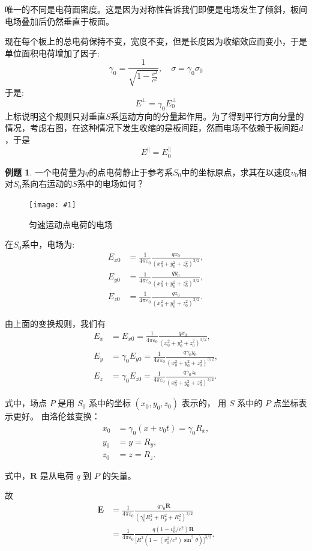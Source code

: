 \documentclass[12pt,a4paper,oneside]{report}
\theoremstyle{definition}
\newtheorem{example}{例题}[chapter]
\theoremstyle{remark}
\newcommand{\insertfig}[3]{
    \begin{figure}[ht]
        \centering
        \texttt{[image: \#1]}
        \caption{#2}
        \label{fig:#1}
    \end{figure}
}
\newcommand{\mb}[1]{\mathbf{#1}}
\begin{document}
唯一的不同是电荷面密度。这是因为对称性告诉我们即便是电场发生了倾斜，板间电场叠加后仍然垂直于板面。

现在每个板上的总电荷保持不变，宽度不变，但是长度因为收缩效应而变小，于是单位面积电荷增加了因子:
\[
\gamma_0 = \frac{1}{\sqrt{1-\frac{v^2}{c^2}}},\quad \sigma = \gamma_0\sigma_0
\]
于是:
\[
E^{\perp} = \gamma_0E_0^{\perp}
\]
上标说明这个规则只对垂直$S$系运动方向的分量起作用。为了得到平行方向分量的情况，考虑右图，在这种情况下发生收缩的是板间距，然而电场不依赖于板间距$d$，于是
\[
E^{\parallel} = E_0^{\parallel}
\]

\begin{example}
  一个电荷量为$q$的点电荷静止于参考系$S_0$中的坐标原点，求其在以速度$v_0$相对$S_0$系向右运动的$S$系中的电场如何？

  \insertfig{5-8.png}{匀速运动点电荷的电场}{0.35}

在$S_0$系中，电场为:
\begin{align*}
E_{x0} &= \frac{1}{4\pi\varepsilon_0} \frac{q x_0}{(x_0^2 + y_0^2 + z_0^2)^{3/2}}, \\[6pt]
E_{y0} &= \frac{1}{4\pi\varepsilon_0} \frac{q y_0}{(x_0^2 + y_0^2 + z_0^2)^{3/2}}, \\[6pt]
E_{z0} &= \frac{1}{4\pi\varepsilon_0} \frac{q z_0}{(x_0^2 + y_0^2 + z_0^2)^{3/2}}.
\end{align*}

由上面的变换规则，我们有
\begin{align*}
E_x &= E_{x0} = \frac{1}{4\pi\varepsilon_0} \frac{q x_0}{(x_0^2 + y_0^2 + z_0^2)^{3/2}}, \\[6pt]
E_y &= \gamma_0 E_{y0} = \frac{1}{4\pi\varepsilon_0} \frac{q \gamma_0 y_0}{(x_0^2 + y_0^2 + z_0^2)^{3/2}}, \\[6pt]
E_z &= \gamma_0 E_{z0} = \frac{1}{4\pi\varepsilon_0} \frac{q \gamma_0 z_0}{(x_0^2 + y_0^2 + z_0^2)^{3/2}}.
\end{align*}

式中，场点 \( P \) 是用 \( S_0 \) 系中的坐标 \((x_0, y_0, z_0)\) 表示的，
用 \( S \) 系中的 \( P \) 点坐标表示更好。
由洛伦兹变换：
\begin{align*}
x_0 &= \gamma_0 (x + v_0 t) = \gamma_0 R_x, \\[4pt]
y_0 &= y = R_y, \\[4pt]
z_0 &= z = R_z.
\end{align*}

式中，\( \mathbf R \) 是从电荷 \( q \) 到 \( P \) 的矢量。

故
\begin{align*}
\mb{E} &= \frac{1}{4\pi\varepsilon_0} 
     \frac{q \gamma_0 \mathbf R}
          {(\gamma_0^2 R_x^2 + R_y^2 + R_z^2)^{3/2}} \\[6pt]
  &= \frac{1}{4\pi\varepsilon_0}
     \frac{q (1 - v_0^2/c^2) \mathbf R}
          {\bigl[R^2 (1 - (v_0^2/c^2)\sin^2\theta)\bigr]^{3/2}}. 
\end{align*}

\end{example}
\end{document}
